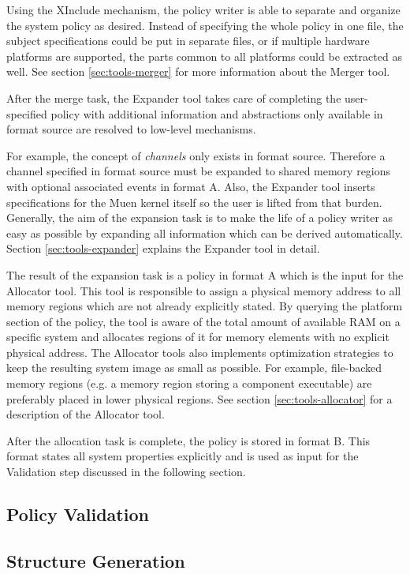 \documentclass[a4paper,twoside,titlepage]{article}
\begin{document}
Using the XInclude mechanism, the policy writer is able to separate and organize
the system policy as desired. Instead of specifying the whole policy in one
file, the subject specifications could be put in separate files, or if multiple
hardware platforms are supported, the parts common to all platforms could be
extracted as well. See section \ref{sec:tools-merger} for more information about
the Merger tool.

After the merge task, the Expander tool takes care of completing the
user-specified policy with additional information and abstractions only
available in format source are resolved to low-level mechanisms.

For example, the concept of \emph{channels} only exists in format source.
Therefore a channel specified in format source must be expanded to shared memory
regions with optional associated events in format A.  Also, the Expander tool
inserts specifications for the Muen kernel itself so the user is lifted from
that burden. Generally, the aim of the expansion task is to make the life of a
policy writer as easy as possible by expanding all information which can be
derived automatically. Section \ref{sec:tools-expander} explains the Expander
tool in detail.

The result of the expansion task is a policy in format A which is the input for
the Allocator tool. This tool is responsible to assign a physical memory address
to all memory regions which are not already explicitly stated. By querying the
platform section of the policy, the tool is aware of the total amount of
available RAM on a specific system and allocates regions of it for memory
elements with no explicit physical address.  The Allocator tools also implements
optimization strategies to keep the resulting system image as small as possible.
For example, file-backed memory regions (e.g. a memory region storing a
component executable) are preferably placed in lower physical regions. See
section \ref{sec:tools-allocator} for a description of the Allocator tool.

After the allocation task is complete, the policy is stored in format B. This
format states all system properties explicitly and is used as input for the
Validation step discussed in the following section.

\subsection{Policy Validation}
\subsection{Structure Generation}
\end{document}
